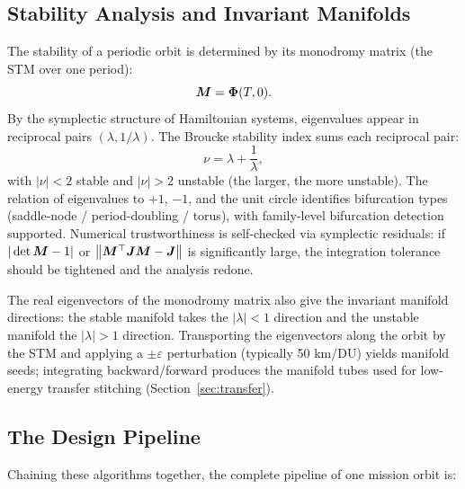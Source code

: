 \subsection{Stability Analysis and Invariant Manifolds}

The stability of a periodic orbit is determined by its monodromy matrix (the
STM over one period):
\begin{equation}
  \bm{M} = \bm{\Phi}(T, 0).
\end{equation}
By the symplectic structure of Hamiltonian systems, eigenvalues appear in
reciprocal pairs $(\lambda, 1/\lambda)$. The Broucke stability index sums
each reciprocal pair:
\begin{equation}
  \nu = \lambda + \frac{1}{\lambda},
\end{equation}
with $|\nu| < 2$ stable and $|\nu| > 2$ unstable (the larger, the more
unstable). The relation of eigenvalues to $+1$, $-1$, and the unit circle
identifies bifurcation types (saddle-node / period-doubling / torus), with
family-level bifurcation detection supported. Numerical trustworthiness is
self-checked via symplectic residuals: if $|\det \bm{M} - 1|$ or
$\left\lVert \bm{M}^\top \bm{J} \bm{M} - \bm{J} \right\rVert$ is significantly large, the
integration tolerance should be tightened and the analysis redone.

The real eigenvectors of the monodromy matrix also give the invariant
manifold directions: the stable manifold takes the $|\lambda| < 1$ direction
and the unstable manifold the $|\lambda| > 1$ direction. Transporting the
eigenvectors along the orbit by the STM and applying a $\pm\varepsilon$
perturbation (typically 50 km/DU) yields manifold seeds; integrating
backward/forward produces the manifold tubes used for low-energy transfer
stitching (Section~\ref{sec:transfer}).

\subsection{The Design Pipeline}

Chaining these algorithms together, the complete pipeline of one mission
orbit is:

